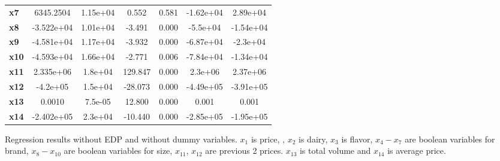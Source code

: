 \documentclass{article}
\begin{document}
\begin{center}
{\begin{tabular}{lcccccc}
\textbf{x7}    &    6345.2504  &     1.15e+04     &     0.552  &         0.581        &    -1.62e+04    &     2.89e+04     \\
\textbf{x8}    &   -3.522e+04  &     1.01e+04     &    -3.491  &         0.000        &     -5.5e+04    &    -1.54e+04     \\
\textbf{x9}    &   -4.581e+04  &     1.17e+04     &    -3.932  &         0.000        &    -6.87e+04    &     -2.3e+04     \\
\textbf{x10}   &   -4.593e+04  &     1.66e+04     &    -2.771  &         0.006        &    -7.84e+04    &    -1.34e+04     \\
\textbf{x11}   &    2.335e+06  &      1.8e+04     &   129.847  &         0.000        &      2.3e+06    &     2.37e+06     \\
\textbf{x12}   &     -4.2e+05  &      1.5e+04     &   -28.073  &         0.000        &    -4.49e+05    &    -3.91e+05     \\
\textbf{x13}   &       0.0010  &      7.5e-05     &    12.800  &         0.000        &        0.001    &        0.001     \\
\textbf{x14}   &   -2.402e+05  &      2.3e+04     &   -10.440  &         0.000        &    -2.85e+05    &    -1.95e+05     \\
\bottomrule
\end{tabular}}
\caption{Regression results without EDP and without dummy variables. $x_1$ is price, , $x_2$ is dairy, $x_3$ is flavor, $x_4-x_7$ are boolean variables for brand, $x_8-x_{10}$ are boolean variables for size, $x_{11}$, $x_{12}$ are previous 2 prices. $x_{13}$ is total volume and $x_{14}$ is average price.}
\end{center}
\end{document}
